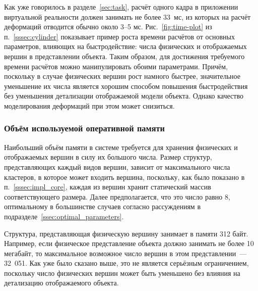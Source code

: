 \documentclass[a4paper, 14pt, titlepage]{extarticle}
\begin{document}
        Как уже говорилось в разделе~\ref{sec:task}, расчёт одного кадра в приложении виртуальной реальности должен
        занимать не более 33~мс, из которых на расчёт деформаций отводится обычно около 3--5 мс. Рис.~\ref{fig:time-plot}
        из п.~\ref{sssec:cylinder} показывает пример роста времени расчётов от основных параметров,
        влияющих на быстродействие: числа физических и отображаемых вершин в представлении объекта.
        Таким образом, для достижения требуемого времени расчётов можно манипулировать обоими
        параметрами. Причём, поскольку в случае физических вершин рост намного быстрее, значительное
        уменьшение их числа является хорошим способом повышения быстродействия без уменьшения
        детализации отображаемой модели объекта. Однако качество моделирования деформаций при этом
        может снизиться.

      \subsubsection{Объём используемой оперативной памяти}

        Наибольший объём памяти в системе требуется для хранения физических и отображаемых вершин в
        силу их большого числа. Размер структур, представляющих каждый видов вершин, зависит от
        максимального числа кластеров, в которое может входить вершина, поскольку, как было показано
        в п.~\ref{sssec:impl_core}, каждая из вершин хранит статический массив соответствующего
        размера. Далее предполагается, что это число равно 8, оптимальному в большинстве случаев
        согласно рассуждениям в подразделе~\ref{ssec:optimal_parameters}.

        Структура, представляющая физическую вершину занимает в памяти 312 байт. Например, если
        физическое представление объекта должно занимать не более 10 мегабайт, то максимальное
        возможное число вершин в этом представлении~--- 32~051. Как уже было сказано выше, это не
        является серьёзным ограничением, поскольку число физических вершин может быть уменьшено без
        влияния на детализацию отображаемого объекта.
\end{document}
